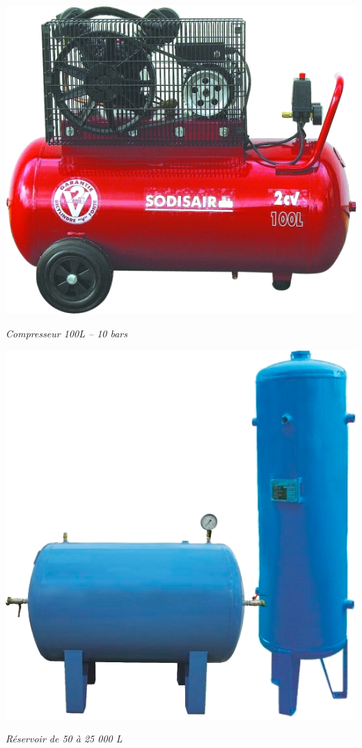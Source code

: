 \documentclass[10pt]{article}
\begin{document}
\begin{minipage}[c]{.3\textwidth}
\begin{center}
\includegraphics[width=.8\textwidth]{images/Compresseur}

\textit{Compresseur 100L -- 10 bars \cite{compresseur}}
\end{center}
\end{minipage} \hfill
\begin{minipage}[c]{.3\textwidth}
\begin{center}
\includegraphics[width=.8\textwidth]{images/reservoir}

\textit{Réservoir de 50 à 25 000 L\cite{reservoir}}
\end{center}
\end{minipage} \hfill
\end{document}
